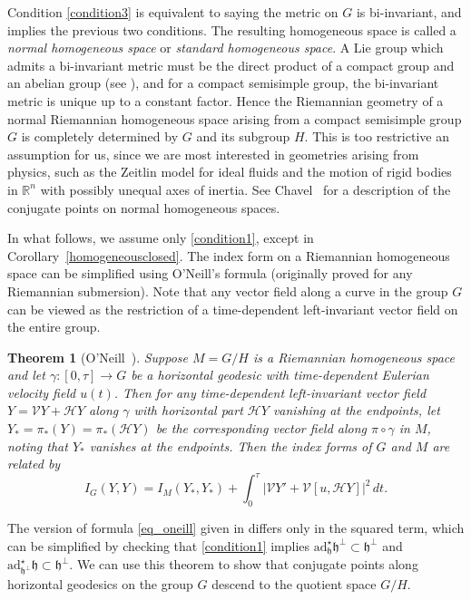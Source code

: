 \documentclass[oneside, 11pt]{amsart}
\newtheorem{theorem}{Theorem}[section]
\numberwithin{equation}{section}
\newcommand{\ad}{\mathrm{ad}}
\newcommand{\adstar}{\ad^{\star}}
\newcommand{\h}{\mathfrak{h}}
\newcommand{\verproj}{\mathscr{V}}
\newcommand{\horproj}{\mathscr{H}}
\begin{document}
Condition \eqref{condition3} is equivalent to saying the metric on $G$ is bi-invariant, and implies the previous two conditions. The resulting homogeneous space is called a \emph{normal homogeneous space} or \emph{standard homogeneous space}. A Lie group which admits a bi-invariant metric must be the direct product of a compact group and an abelian group (see \cite{Milnor}), and for a compact semisimple group, the bi-invariant metric is unique up to a constant factor. Hence the Riemannian geometry of a normal Riemannian homogeneous space arising from a compact semisimple group $G$ is completely determined by $G$ and its subgroup $H$. This is too restrictive an assumption for us, since we are most interested in geometries arising from physics, such as the Zeitlin model for ideal fluids and the motion of rigid bodies in $\mathbb{R}^n$ with possibly unequal axes of inertia. 
See Chavel~\cite{Chavel2} for a description of the conjugate points on normal homogeneous spaces. 

In what follows, we assume only \eqref{condition1}, except in Corollary~\ref{homogeneousclosed}. The index form on a Riemannian homogeneous space can be simplified using O'Neill's formula (originally proved for any Riemannian submersion). Note that any vector field along a curve in the group $G$ can be viewed as the restriction of a time-dependent left-invariant vector field on the entire group. 
\begin{theorem}[O'Neill~\cite{oneillconjugate}]\label{oneillhomogeneousindex}
Suppose $M=G/H$ is a Riemannian homogeneous space and let $\gamma\colon [0,\tau]\to G$ be a horizontal geodesic with time-dependent Eulerian velocity field $u(t)$. Then for any time-dependent left-invariant vector field $Y=\verproj Y+\horproj Y$ along $\gamma$ with horizontal part $\horproj Y$ vanishing at the endpoints, let $Y_*=\pi_*(Y)=\pi_*(\horproj Y)$ be the corresponding vector field along $\pi\circ\gamma$ in $M$, noting that $Y_*$ vanishes at the endpoints.  Then the index forms of $G$ and $M$ are related by 
\begin{equation}\label{eq_oneill}
    I_G(Y,Y) = I_M(Y_*,Y_*) + \int_0^{\tau} \lvert \verproj Y'+\verproj[u,\horproj Y]\rvert^2 \, dt.
\end{equation}
\end{theorem}
The version of formula \eqref{eq_oneill} given in \cite{oneillconjugate} differs only in the squared term, which can be simplified by checking that \eqref{condition1} implies $\adstar_\h\h^\perp\subset\h^\perp$ and $\adstar_{\h^\perp} \h\subset\h^\perp$. We can use this theorem to show that conjugate points along horizontal geodesics on the group $G$ descend to the quotient space $G/H$.
\end{document}
